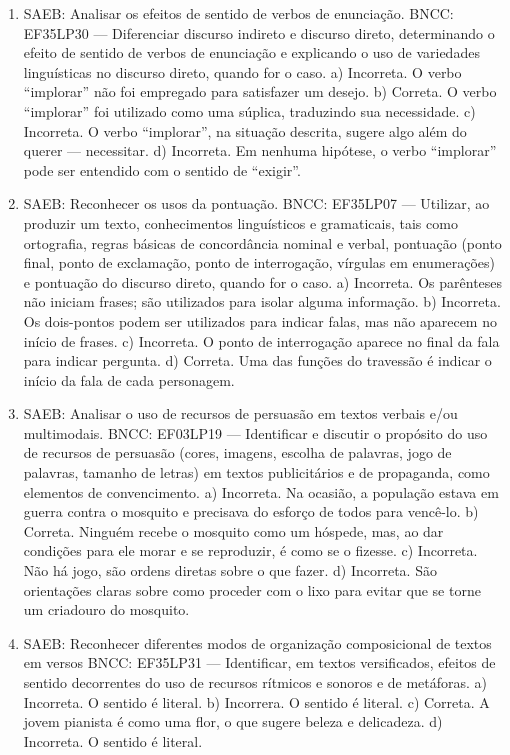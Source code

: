 \begin{enumerate}
\item
SAEB: Analisar os efeitos de sentido de verbos de enunciação. BNCC: EF35LP30 --- Diferenciar discurso indireto e discurso direto, determinando o efeito de sentido de verbos de enunciação e explicando o uso de variedades linguísticas no discurso direto, quando for o caso. a) Incorreta. O verbo ``implorar'' não foi empregado para satisfazer um desejo. b) Correta. O verbo ``implorar'' foi utilizado como uma súplica, traduzindo sua necessidade. c) Incorreta. O verbo ``implorar'', na situação descrita, sugere algo além do querer --- necessitar. d) Incorreta. Em nenhuma hipótese, o verbo ``implorar'' pode ser
entendido com o sentido de ``exigir''.

\item
SAEB: Reconhecer os usos da pontuação. BNCC: EF35LP07 --- Utilizar, ao produzir um texto, conhecimentos linguísticos e gramaticais, tais como ortografia, regras básicas de concordância nominal e verbal, pontuação (ponto final, ponto de exclamação, ponto de interrogação, vírgulas em enumerações) e pontuação do discurso direto, quando for o caso. a) Incorreta. Os parênteses não iniciam frases; são utilizados para isolar alguma informação. b) Incorreta. Os dois-pontos podem ser utilizados para indicar falas, mas não aparecem no início de frases. c) Incorreta. O ponto de interrogação aparece no final da fala para indicar pergunta. d) Correta. Uma das funções do travessão é indicar o início da fala de cada personagem.

\item
SAEB: Analisar o uso de recursos de persuasão em textos verbais e/ou multimodais. BNCC: EF03LP19 --- Identificar e discutir o propósito do uso de recursos de persuasão (cores, imagens, escolha de palavras, jogo de palavras, tamanho de letras) em textos publicitários e de propaganda, como elementos de convencimento. a) Incorreta. Na ocasião, a população estava em guerra contra o mosquito e precisava do esforço de todos para vencê-lo. b) Correta. Ninguém recebe o mosquito como um hóspede, mas, ao dar condições para ele morar e se reproduzir, é como se o fizesse. c) Incorreta. Não há jogo, são ordens diretas sobre o que fazer. d) Incorreta. São orientações claras sobre como proceder com o lixo para evitar que se torne um criadouro do mosquito.

\item
SAEB: Reconhecer diferentes modos de organização composicional de textos em versos BNCC: EF35LP31 --- Identificar, em textos versificados, efeitos de sentido decorrentes do uso de recursos rítmicos e sonoros e de metáforas. a) Incorreta. O sentido é literal. b) Incorrera. O sentido é literal. c) Correta. A jovem pianista é como uma flor, o que sugere beleza e delicadeza. d) Incorreta. O sentido é literal.


\end{enumerate}
